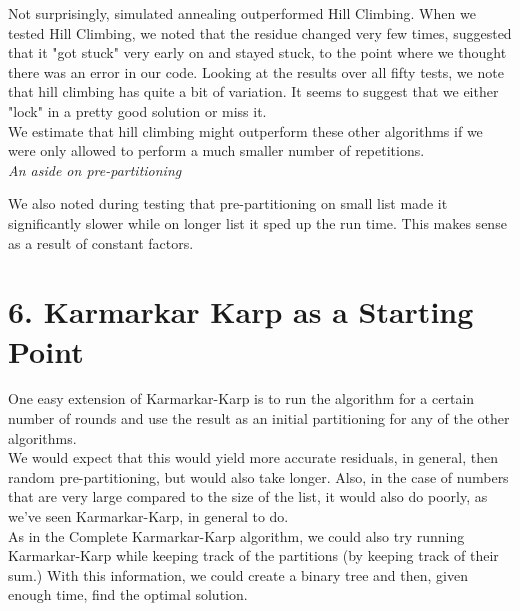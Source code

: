 \documentclass{article}
\begin{document}
Not surprisingly, simulated annealing outperformed Hill Climbing. When we tested Hill Climbing, we noted that the residue changed very few times, suggested that it "got stuck" very early on and stayed stuck, to the point where we thought there was an error in our code. Looking at the results over all fifty tests, we note that hill climbing has quite a bit of variation. It seems to suggest that we either "lock" in a pretty good solution or miss it.\\

We estimate that hill climbing might outperform these other algorithms if we were only allowed to perform a much smaller number of repetitions.\\

\emph{An aside on pre-partitioning}

We also noted during testing that pre-partitioning on small list made it significantly slower while on longer list it sped up the run time. This makes sense as a result of constant factors. \\

\section*{6. Karmarkar Karp as a Starting Point}
One easy extension of Karmarkar-Karp is to run the algorithm for a certain number of rounds and use the result as an initial partitioning for any of the other algorithms.\\

We would expect that this would yield more accurate residuals, in general, then random pre-partitioning, but would also take longer. Also, in the case of numbers that are very large compared to the size of the list, it would also do poorly, as we've seen Karmarkar-Karp, in general to do. \\

As in the Complete Karmarkar-Karp algorithm, we could also try running Karmarkar-Karp while keeping track of the partitions (by keeping track of their sum.) With this information, we could create a binary tree and then, given enough time, find the optimal solution. 
\end{document}
